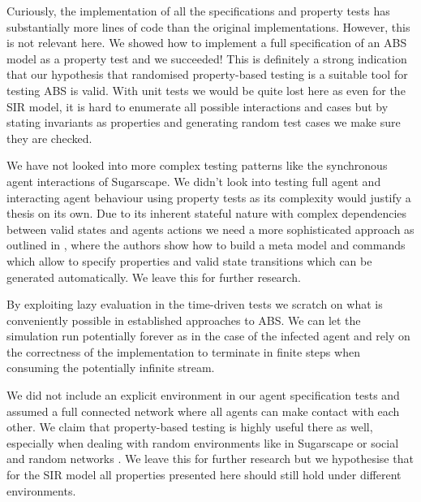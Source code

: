 
Curiously, the implementation of all the specifications and property tests has substantially more lines of code than the original implementations. However, this is not relevant here. We showed how to implement a full specification of an ABS model as a property test and we succeeded! This is definitely a strong indication that our hypothesis that randomised property-based testing is a suitable tool for testing ABS is valid. With unit tests we would be quite lost here as even for the SIR model, it is hard to enumerate all possible interactions and cases but by stating invariants as properties and generating random test cases we make sure they are checked.

We have not looked into more complex testing patterns like the synchronous agent interactions of Sugarscape. We didn't look into testing full agent and interacting agent behaviour using property tests as its complexity would justify a thesis on its own. Due to its inherent stateful nature with complex dependencies between valid states and agents actions we need a more sophisticated approach as outlined in \cite{de_vries_quickcheckstatemachine}, where the authors show how to build a meta model and commands which allow to specify properties and valid state transitions which can be generated automatically. We leave this for further research.

By exploiting lazy evaluation in the time-driven tests we scratch on what is conveniently possible in established approaches to ABS. We can let the simulation run potentially forever as in the case of the infected agent and rely on the correctness of the implementation to terminate in finite steps when consuming the potentially infinite stream.

We did not include an explicit environment in our agent specification tests and assumed a full connected network where all agents can make contact with each other. We claim that property-based testing is highly useful there as well, especially when dealing with random environments like in Sugarscape or social and random networks \cite{easley_networks_2010,jackson_social_2008}. We leave this for further research but we hypothesise that for the SIR model all properties presented here should still hold under different environments.
